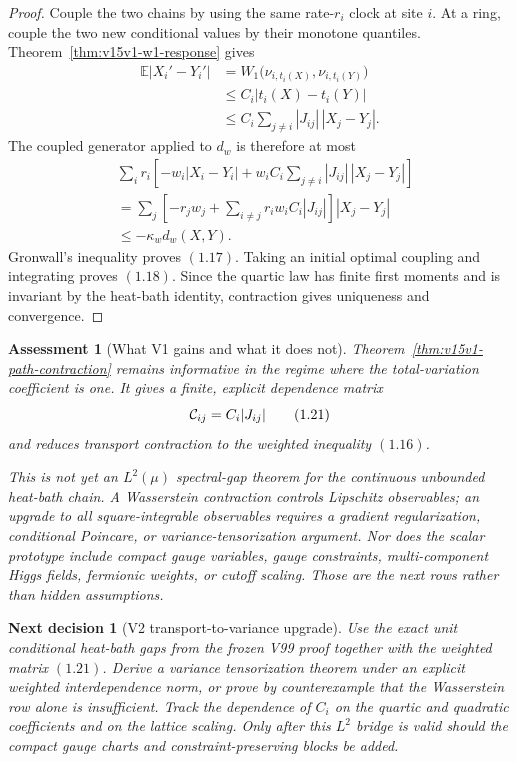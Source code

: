 \documentclass[11pt]{article}
\newtheorem{decision}[theorem]{Next decision}
\newtheorem{assessment}[theorem]{Assessment}
\theoremstyle{remark}
\begin{document}
\begin{proof}
Couple the two chains by using the same rate-\(r_i\) clock at site
\(i\).  At a ring, couple the two new conditional values by their
monotone quantiles.  Theorem~\ref{thm:v15v1-w1-response} gives
\[
 \begin{split}
 \mathbb E|X_i'-Y_i'|
 &=
 W_1\bigl(\nu_{i,t_i(X)},\nu_{i,t_i(Y)}\bigr)\\
 &\le C_i|t_i(X)-t_i(Y)|\\
 &\le C_i\sum_{j\ne i}|J_{ij}|\,|X_j-Y_j|.                  \tag{1.19}
 \end{split}
\]
The coupled generator applied to \(d_w\) is therefore at most
\[
 \begin{split}
 &\sum_i r_i\left[
 -w_i|X_i-Y_i|
 +w_iC_i\sum_{j\ne i}|J_{ij}|\,|X_j-Y_j|
 \right]\\
 &=
 \sum_j\left[
 -r_jw_j+\sum_{i\ne j}r_iw_iC_i|J_{ij}|
 \right]|X_j-Y_j|\\
 &\le-\kappa_wd_w(X,Y).                                      \tag{1.20}
 \end{split}
\]
Gronwall's inequality proves \((1.17)\).  Taking an initial optimal
coupling and integrating proves \((1.18)\).  Since the quartic law
has finite first moments and is invariant by the heat-bath
identity, contraction gives uniqueness and convergence.
\end{proof}

\begin{assessment}[What V1 gains and what it does not]
\label{ass:v15v1-gain}
Theorem~\ref{thm:v15v1-path-contraction} remains informative in
the regime where the total-variation coefficient is one.  It gives
a finite, explicit dependence matrix
\[
 {\cal C}_{ij}=C_i|J_{ij}|                                   \tag{1.21}
\]
and reduces transport contraction to the weighted inequality
\((1.16)\).

This is not yet an \(L^2(\mu)\) spectral-gap theorem for the
continuous unbounded heat-bath chain.  A Wasserstein contraction
controls Lipschitz observables; an upgrade to all square-integrable
observables requires a gradient regularization, conditional
Poincare, or variance-tensorization argument.  Nor does the scalar
prototype include compact gauge variables, gauge constraints,
multi-component Higgs fields, fermionic weights, or cutoff scaling.
Those are the next rows rather than hidden assumptions.
\end{assessment}

\begin{decision}[V2 transport-to-variance upgrade]
\label{dec:v15v1-next}
Use the exact unit conditional heat-bath gaps from the frozen V99
proof together with the weighted matrix \((1.21)\).  Derive a
variance tensorization theorem under an explicit weighted
interdependence norm, or prove by counterexample that the
Wasserstein row alone is insufficient.  Track the dependence of
\(C_i\) on the quartic and quadratic coefficients and on the
lattice scaling.  Only after this \(L^2\) bridge is valid should the
compact gauge charts and constraint-preserving blocks be added.
\end{decision}
\end{document}
